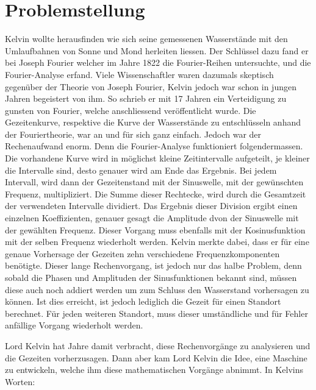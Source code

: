 %
%
%
%
\section{Problemstellung
\label{gezeiten:section:teil1}}
Kelvin wollte herausfinden wie sich seine gemessenen Wasserstände mit den Umlaufbahnen von Sonne und Mond herleiten liessen.
Der Schlüssel dazu fand er bei Joseph Fourier welcher im Jahre 1822 die Fourier-Reihen untersuchte, und die Fourier-Analyse erfand.
Viele Wissenschaftler waren dazumals skeptisch gegenüber der Theorie von Joseph Fourier, Kelvin jedoch war schon in jungen Jahren begeistert von ihm.
So schrieb er mit 17 Jahren ein Verteidigung zu gunsten von Fourier, welche anschliessend veröffentlicht wurde.
Die Gezeitenkurve, respektive die Kurve der Wasserstände zu entschlüsseln anhand der Fouriertheorie, war an und für sich ganz einfach.
Jedoch war der Rechenaufwand enorm.
Denn die Fourier-Analyse funktioniert folgendermassen.
Die vorhandene Kurve wird in möglichst kleine Zeitintervalle aufgeteilt, je kleiner die Intervalle sind, desto genauer wird am Ende das Ergebnis.
Bei jedem Intervall, wird dann der Gezeitenstand mit der Sinuswelle, mit der gewünschten Frequenz, multipliziert.
Die Summe dieser Rechtecke, wird durch die Gesamtzeit der verwendeten Intervalle dividiert.
Das Ergebnis dieser Division ergibt einen einzelnen Koeffizienten, genauer gesagt die Amplitude dvon der Sinuswelle mit der gewählten Frequenz.
Dieser Vorgang muss ebenfalls mit der Kosinusfunktion mit der selben Frequenz wiederholt werden.
Kelvin merkte dabei, dass er für eine genaue Vorhersage der Gezeiten zehn verschiedene Frequenzkomponenten benötigte.
Dieser lange Rechenvorgang, ist jedoch nur das halbe Problem, denn sobald die Phasen und Amplituden der Sinusfunktionen bekannt sind, müssen diese auch noch addiert werden um zum Schluss den Wasserstand vorhersagen zu können.
Ist dies erreicht, ist jedoch lediglich die Gezeit für einen Standort berechnet.
Für jeden weiteren Standort, muss dieser umständliche und für Fehler anfällige Vorgang wiederholt werden.

Lord Kelvin hat Jahre damit verbracht, diese Rechenvorgänge zu analysieren und die Gezeiten vorherzusagen.
Dann aber kam Lord Kelvin die Idee, eine Maschine zu entwickeln, welche ihm diese mathematischen Vorgänge abnimmt. In Kelvins Worten: \grqq




